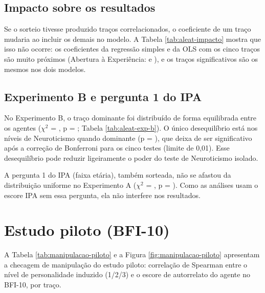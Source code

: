 

\subsection{Impacto sobre os resultados}

Se o sorteio tivesse produzido traços correlacionados, o coeficiente de um
traço mudaria ao incluir os demais no modelo. A Tabela
\ref{tab:aleat-impacto} mostra que isso não ocorre: os coeficientes da
regressão simples e da OLS com os cinco traços são muito próximos (Abertura à
Experiência: \aleatAberturaCoefSimples{} e \aleatAberturaCoefMulti), e os
traços significativos são os mesmos nos dois modelos.



\subsection{Experimento B e pergunta 1 do IPA}

No Experimento B, o traço dominante foi distribuído de forma equilibrada
entre os agentes ($\chi^2$ = \aleatDominanteChi, p = \aleatDominanteP;
Tabela \ref{tab:aleat-exp-b}). O único desequilíbrio está nos níveis de
Neuroticismo quando dominante (p = \aleatNeuroBP), que deixa de ser
significativo após a correção de Bonferroni para os cinco testes (limite
de 0,01). Esse desequilíbrio pode reduzir ligeiramente o poder do teste
de Neuroticismo isolado.



A pergunta 1 do IPA (faixa etária), também sorteada, não se afastou da
distribuição uniforme no Experimento A ($\chi^2$ = \aleatQUmChi, p =
\aleatQUmP). Como as análises usam o escore IPA sem essa pergunta, ela não
interfere nos resultados.

\section{Estudo piloto (BFI-10)}
\label{sec:resultados-piloto}

A Tabela \ref{tab:manipulacao-piloto} e a Figura \ref{fig:manipulacao-piloto}
apresentam a checagem de manipulação do estudo piloto: correlação de
Spearman entre o nível de personalidade induzido (1/2/3) e o escore de
autorrelato do agente no BFI-10, por traço.


